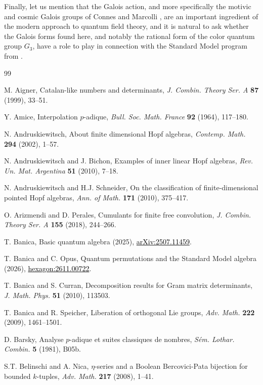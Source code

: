 \documentclass[11pt]{amsart}
\theoremstyle{definition}
\begin{document}
Finally, let us mention that the Galois action, and more specifically the motivic and cosmic Galois groups of Connes and Marcolli \cite{cma}, are an important ingredient of the modern approach to quantum field theory, and it is natural to ask whether the Galois forms found here, and notably the rational form of the color quantum group $G_3$, have a role to play in connection with the Standard Model program from \cite{bop}.

\begin{thebibliography}{99}

 M. Aigner, Catalan-like numbers and determinants, {\em J. Combin. Theory Ser. A} {\bf 87} (1999), 33--51.

 Y. Amice, Interpolation $p$-adique, {\em Bull. Soc. Math. France} {\bf 92} (1964), 117--180.

 N. Andruskiewitsch, About finite dimensional Hopf algebras, {\em Contemp. Math.} {\bf 294} (2002), 1--57.

 N. Andruskiewitsch and J. Bichon, Examples of inner linear Hopf algebras, {\em Rev. Un. Mat. Argentina} {\bf 51} (2010), 7--18.

 N. Andruskiewitsch and H.J. Schneider, On the classification of finite-dimensional pointed Hopf algebras, {\em Ann. of Math.} {\bf 171} (2010), 375--417.

 O. Arizmendi and D. Perales, Cumulants for finite free convolution, {\em J. Combin. Theory Ser. A} {\bf 155} (2018), 244--266.

 T. Banica, Basic quantum algebra (2025), \href{https://arxiv.org/pdf/2507.11459}{\textcolor{black}{\mbox{arXiv:2507.11459}}}.

 T. Banica and C. Opus, Quantum permutations and the Standard Model algebra (2026), \href{https://hexagonmath.org/2611.00722v1}{\textcolor{black}{\mbox{hexagon:2611.00722}}}.

 T. Banica and S. Curran, Decomposition results for Gram matrix determinants, {\em J. Math. Phys.} {\bf 51} (2010), 113503.

 T. Banica and R. Speicher, Liberation of orthogonal Lie groups, {\em Adv. Math.} {\bf 222} (2009), 1461--1501.

 D. Barsky, Analyse $p$-adique et suites classiques de nombres, {\em S\'em. Lothar. Combin.} {\bf 5} (1981), B05b.

 S.T. Belinschi and A. Nica, $\eta$-series and a Boolean Bercovici-Pata bijection for bounded $k$-tuples, {\em Adv. Math.} {\bf 217} (2008), 1--41.


\end{thebibliography}
\end{document}
